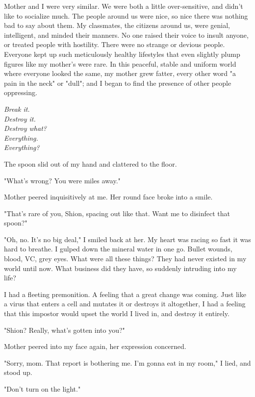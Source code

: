 Mother and I were very similar. We were both a little over-sensitive,
and didn't like to socialize much. The people around us were nice, so
nice there was nothing bad to say about them. My classmates, the
citizens around us, were genial, intelligent, and minded their manners.
No one raised their voice to insult anyone, or treated people with
hostility. There were no strange or devious people. Everyone kept up
such meticulously healthy lifestyles that even slightly plump figures
like my mother's were rare. In this peaceful, stable and uniform world
where everyone looked the same, my mother grew fatter, every other word
"a pain in the neck" or "dull"; and I began to find the presence of
other people oppressing.

\myspace

\emph{Break it.\\
	Destroy it.\\
	Destroy what?\\
	Everything.\\
	Everything?}

\myspace

The spoon slid out of my hand and clattered to the floor.

"What's wrong? You were miles away."

Mother peered inquisitively at me. Her round face broke into a smile.

"That's rare of you, Shion, spacing out like that. Want me to disinfect
that spoon?"

"Oh, no. It's no big deal," I smiled back at her. My heart was racing so
fast it was hard to breathe. I gulped down the mineral water in one go.
Bullet wounds, blood, VC, grey eyes. What were all these things? They
had never existed in my world until now. What business did they have, so
suddenly intruding into my life?

I had a fleeting premonition. A feeling that a great change was coming.
Just like a virus that enters a cell and mutates it or destroys it
altogether, I had a feeling that this impostor would upset the world I
lived in, and destroy it entirely.

"Shion? Really, what's gotten into you?"

Mother peered into my face again, her expression concerned.

"Sorry, mom. That report is bothering me. I'm gonna eat in my room," I
lied, and stood up.

\myspace

"Don't turn on the light."


